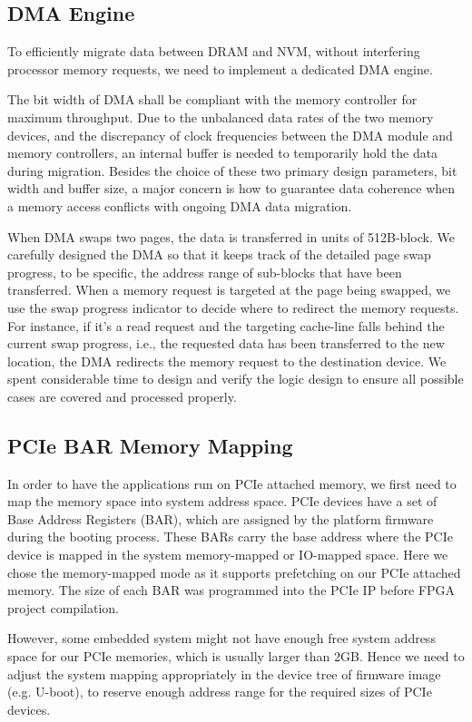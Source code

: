 \documentclass[conference]{IEEEtran}
\begin{document}
\subsection{DMA Engine}
To efficiently migrate data between DRAM and NVM, without interfering processor memory requests, we need to implement a dedicated DMA engine.\par
The bit width of DMA shall be compliant with the memory controller for maximum throughput. Due to the unbalanced data rates of the two memory devices, and the discrepancy of clock frequencies between the DMA module and memory controllers, an internal buffer is needed to temporarily hold the data during migration. Besides the choice of these two primary design parameters, bit width and buffer size, a major concern is how to guarantee data coherence when a memory access conflicts with ongoing DMA data migration.\par
When DMA swaps two pages, the data is transferred in units of 512B-block.  We carefully designed the DMA so that it keeps track of the detailed page swap progress, to be specific, the address range of sub-blocks that have been transferred. When a memory request is targeted at the page being swapped, we use the swap progress indicator to decide where to redirect the memory requests. For instance, if it's a read request and the targeting cache-line falls behind the current swap progress, i.e., the requested data has been transferred to the new location, the DMA redirects the memory request to the destination device.  We spent considerable time to design and verify the logic design to ensure all possible cases are covered and processed properly.
\subsection{PCIe BAR Memory Mapping}
In order to have the applications run on PCIe attached memory, we first need to map the memory space into system address space.
PCIe devices have a set of Base Address Registers (BAR), which are assigned by the platform firmware during the booting process. These BARs carry the base address where the PCIe device is mapped in the system memory-mapped or IO-mapped space. Here we chose the memory-mapped mode as it supports prefetching on our PCIe attached memory. The size of each BAR was programmed into the PCIe IP before FPGA project compilation. \par However, some embedded system might not have enough free system address space for our PCIe memories, which is usually larger than 2GB.
Hence we need to adjust the system mapping appropriately in the device tree of firmware image (e.g. U-boot), to reserve enough address range for the required sizes of PCIe devices. 
\end{document}

